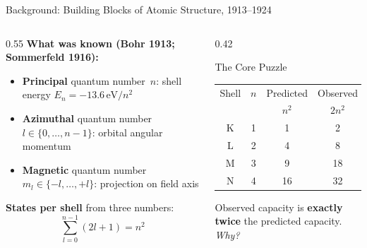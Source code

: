 \documentclass[aspectratio=169,12pt]{beamer}
\begin{document}
\begin{frame}{Background: Building Blocks of Atomic Structure, 1913--1924}

\begin{columns}[T]
\begin{column}{0.55\textwidth}
\textbf{What was known (Bohr 1913; Sommerfeld 1916):}
\begin{itemize}
  \item \textbf{Principal} quantum number~$n$: shell energy
    $E_n = -13.6\,\text{eV}/n^2$
  \item \textbf{Azimuthal} quantum number~$l\in\{0,\ldots,n{-}1\}$:
    orbital angular momentum
  \item \textbf{Magnetic} quantum number~$m_l\in\{-l,\ldots,+l\}$:
    projection on field axis
\end{itemize}

\bigskip
\textbf{States per shell} from three numbers:
\[
  \sum_{l=0}^{n-1}(2l+1) = n^2
\]
\end{column}
\begin{column}{0.42\textwidth}
\begin{alertblock}{The Core Puzzle}
\begin{tabular}{cccc}
\toprule
Shell & $n$ & Predicted & Observed \\
      &     & $n^2$     & $2n^2$ \\
\midrule
K & 1 &  1 &  2 \\
L & 2 &  4 &  8 \\
M & 3 &  9 & 18 \\
N & 4 & 16 & 32 \\
\bottomrule
\end{tabular}

\medskip
Observed capacity is \textbf{exactly twice}
the predicted capacity.\\[4pt]
\emph{Why?}
\end{alertblock}
\end{column}
\end{columns}

\end{frame}
\end{document}
